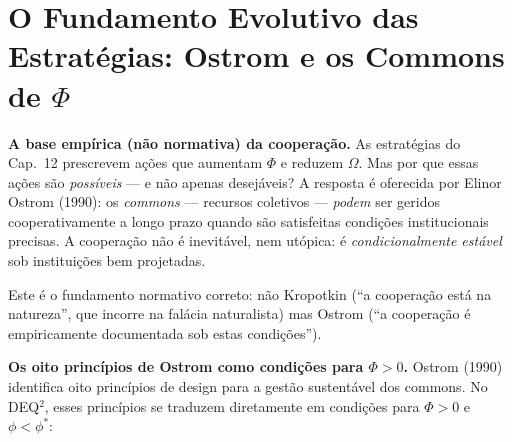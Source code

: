 \section{O Fundamento Evolutivo das Estrat\'{e}gias: Ostrom e os Commons de \(\Phi\)}\label{il-fondamento-evolutivo-delle-strategie}

\Proved{} \textbf{A base emp\'{i}rica (n\~{a}o normativa) da
coopera\c{c}\~{a}o.} As estrat\'{e}gias do Cap.~12 prescrevem a\c{c}\~{o}es
que aumentam $\Phi$ e reduzem $\Omega$. Mas por que essas a\c{c}\~{o}es
s\~{a}o \emph{poss\'{i}veis} --- e n\~{a}o apenas desej\'{a}veis? A
resposta \'{e} oferecida por Elinor Ostrom (1990): os \emph{commons} ---
recursos coletivos --- \emph{podem} ser geridos cooperativamente a longo
prazo quando s\~{a}o satisfeitas condi\c{c}\~{o}es institucionais
precisas. A coopera\c{c}\~{a}o n\~{a}o \'{e} inevit\'{a}vel, nem
ut\'{o}pica: \'{e} \emph{condicionalmente est\'{a}vel} sob
institui\c{c}\~{o}es bem projetadas.

Este \'{e} o fundamento normativo correto: n\~{a}o Kropotkin (``a
coopera\c{c}\~{a}o est\'{a} na natureza'', que incorre na fal\'{a}cia
naturalista) mas Ostrom (``a coopera\c{c}\~{a}o \'{e} empiricamente
documentada sob estas condi\c{c}\~{o}es'').

\Hypoth{} \textbf{Os oito princ\'{i}pios de Ostrom como condi\c{c}\~{o}es
para \(\Phi > 0\).} Ostrom (1990) identifica oito princ\'{i}pios de
design para a gest\~{a}o sustent\'{a}vel dos commons. No DEQ$^2$, esses
princ\'{i}pios se traduzem diretamente em condi\c{c}\~{o}es para
$\Phi > 0$ e $\phi < \phi^*$:

